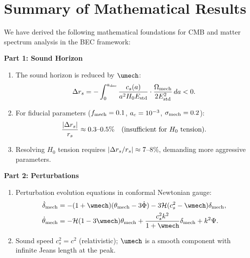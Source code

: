 
\section{Summary of Mathematical Results}
\label{sec:summary}

\begin{proposition}
\label{prop:summary_paper4}
We have derived the following mathematical foundations for CMB and matter spectrum analysis in the BEC framework:

\textbf{Part 1: Sound Horizon}
\begin{enumerate}
\item The sound horizon is reduced by $\umech$:
\begin{equation}
\Delta r_s = -\int_0^{a_{\mathrm{dec}}} \frac{c_s(a)}{a^2 H_0 E_{\mathrm{std}}} \cdot \frac{\Omega_{\mathrm{mech}}}{2E_{\mathrm{std}}^2} \, da < 0.
\end{equation}

\item For fiducial parameters ($f_{\mathrm{mech}} = 0.1$, $a_c = 10^{-3}$, $\sigma_{\mathrm{mech}} = 0.2$):
\begin{equation}
\frac{|\Delta r_s|}{r_s} \approx 0.3\text{--}0.5\% \quad \text{(insufficient for $H_0$ tension)}.
\end{equation}

\item Resolving $H_0$ tension requires $|\Delta r_s/r_s| \approx 7$--$8\%$, demanding more aggressive parameters.
\end{enumerate}

\textbf{Part 2: Perturbations}
\begin{enumerate}
\item Perturbation evolution equations in conformal Newtonian gauge:
\begin{align}
\dot{\delta}_{\mathrm{mech}} &= -(1+\wmech)(\theta_{\mathrm{mech}} - 3\dot{\Phi}) - 3\mathcal{H}(c_s^2 - \wmech)\delta_{\mathrm{mech}}, \\
\dot{\theta}_{\mathrm{mech}} &= -\mathcal{H}(1-3\wmech)\theta_{\mathrm{mech}} + \frac{c_s^2 k^2}{1+\wmech}\delta_{\mathrm{mech}} + k^2\Psi.
\end{align}

\item Sound speed $c_s^2 = c^2$ (relativistic); $\umech$ is a smooth component with infinite Jeans length at the peak.


\end{enumerate}
\end{proposition}
